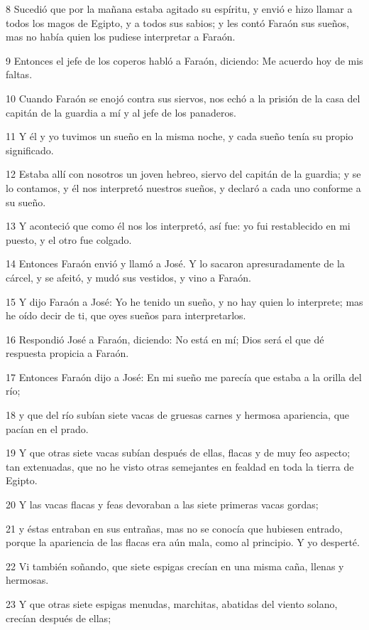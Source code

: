 8 Sucedió que por la mañana estaba agitado su espíritu, y envió e hizo llamar a todos los magos de Egipto, y a todos sus sabios; y les contó Faraón sus sueños, mas no había quien los pudiese interpretar a Faraón.

9 Entonces el jefe de los coperos habló a Faraón, diciendo: Me acuerdo hoy de mis faltas.

10 Cuando Faraón se enojó contra sus siervos, nos echó a la prisión de la casa del capitán de la guardia a mí y al jefe de los panaderos.

11 Y él y yo tuvimos un sueño en la misma noche, y cada sueño tenía su propio significado.

12 Estaba allí con nosotros un joven hebreo, siervo del capitán de la guardia; y se lo contamos, y él nos interpretó nuestros sueños, y declaró a cada uno conforme a su sueño.

13 Y aconteció que como él nos los interpretó, así fue: yo fui restablecido en mi puesto, y el otro fue colgado.

14 Entonces Faraón envió y llamó a José. Y lo sacaron apresuradamente de la cárcel, y se afeitó, y mudó sus vestidos, y vino a Faraón.

15 Y dijo Faraón a José: Yo he tenido un sueño, y no hay quien lo interprete; mas he oído decir de ti, que oyes sueños para interpretarlos.

16 Respondió José a Faraón, diciendo: No está en mí; Dios será el que dé respuesta propicia a Faraón.

17 Entonces Faraón dijo a José: En mi sueño me parecía que estaba a la orilla del río;

18 y que del río subían siete vacas de gruesas carnes y hermosa apariencia, que pacían en el prado.

19 Y que otras siete vacas subían después de ellas, flacas y de muy feo aspecto; tan extenuadas, que no he visto otras semejantes en fealdad en toda la tierra de Egipto.

20 Y las vacas flacas y feas devoraban a las siete primeras vacas gordas;

21 y éstas entraban en sus entrañas, mas no se conocía que hubiesen entrado, porque la apariencia de las flacas era aún mala, como al principio. Y yo desperté.

22 Vi también soñando, que siete espigas crecían en una misma caña, llenas y hermosas.

23 Y que otras siete espigas menudas, marchitas, abatidas del viento solano, crecían después de ellas;

